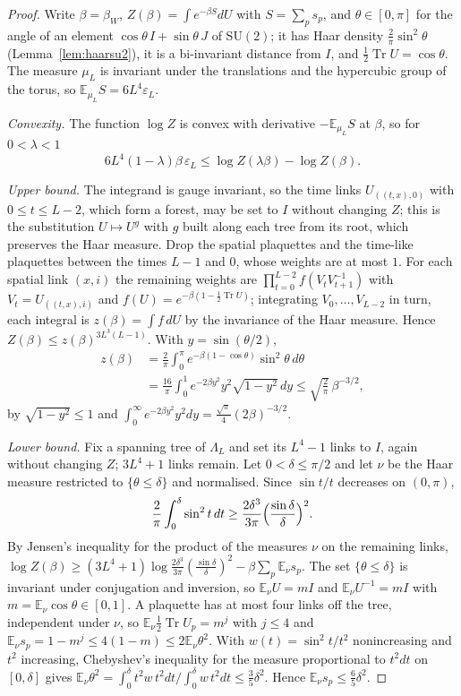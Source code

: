 \documentclass[aps,prd,twocolumn,superscriptaddress,nofootinbib,longbibliography,floatfix,amsmath,amssymb,10pt]{revtex4-2}
\theoremstyle{definition}
\theoremstyle{remark}
\newcommand{\E}{\mathbb{E}}
\newcommand{\SU}{\mathrm{SU}}
\newcommand{\Tr}{\operatorname{Tr}}
\begin{document}
\begin{proof}
Write $\beta=\beta_W$, $Z(\beta)=\int e^{-\beta S}dU$ with $S=\sum_ps_p$, and
$\theta\in[0,\pi]$ for the angle of an element $\cos\theta\,I+\sin\theta\,J$
of $\SU(2)$; it has Haar density $\frac2\pi\sin^2\theta$ (Lemma~\ref{lem:haarsu2}), it is a
bi-invariant distance from $I$, and $\frac12\Tr U=\cos\theta$. The measure
$\mu_L$ is invariant under the translations and the hypercubic group of the
torus, so $\E_{\mu_L}S=6L^4\varepsilon_L$.

\emph{Convexity.} The function $\log Z$ is convex with derivative
$-\E_{\mu_L}S$ at $\beta$, so for $0<\lambda<1$
\[
6L^4(1-\lambda)\beta\,\varepsilon_L\le\log Z(\lambda\beta)-\log Z(\beta) .
\]

\emph{Upper bound.} The integrand is gauge invariant, so the time links
$U_{((t,x),0)}$ with $0\le t\le L-2$, which form a forest, may be set to $I$
without changing $Z$; this is the substitution $U\mapsto U^g$ with $g$ built
along each tree from its root, which preserves the Haar measure. Drop the
spatial plaquettes and the time-like plaquettes between the times $L-1$ and
$0$, whose weights are at most $1$. For each spatial link $(x,i)$ the
remaining weights are $\prod_{t=0}^{L-2}f(V_tV_{t+1}^{-1})$ with
$V_t=U_{((t,x),i)}$ and $f(U)=e^{-\beta(1-\frac12\Tr U)}$; integrating
$V_0,\dots,V_{L-2}$ in turn, each integral is $z(\beta)=\int f\,dU$ by the
invariance of the Haar measure. Hence $Z(\beta)\le z(\beta)^{3L^3(L-1)}$.
With $y=\sin(\theta/2)$,
\begin{align*}
z(\beta)&=\frac2\pi\int_0^\pi e^{-\beta(1-\cos\theta)}\sin^2\theta\,d\theta\\
&=\frac{16}\pi\int_0^1e^{-2\beta y^2}y^2\sqrt{1-y^2}\,dy\le
\sqrt{\frac2\pi}\,\beta^{-3/2},
\end{align*}
by $\sqrt{1-y^2}\le1$ and $\int_0^\infty e^{-2\beta y^2}y^2dy=\frac{\sqrt\pi}4
(2\beta)^{-3/2}$.

\emph{Lower bound.} Fix a spanning tree of $\Lambda_L$ and set its $L^4-1$
links to $I$, again without changing $Z$; $3L^4+1$ links remain. Let $0<\delta
\le\pi/2$ and let $\nu$ be the Haar measure restricted to $\{\theta\le\delta\}$
and normalised. Since $\sin t/t$ decreases on $(0,\pi)$,
\[
\frac2\pi\int_0^\delta\sin^2t\,dt\ge\frac{2\delta^3}{3\pi}\Bigl(\frac{\sin
\delta}\delta\Bigr)^2 .
\]
By Jensen's inequality for the product of the measures $\nu$ on the remaining
links, $\log Z(\beta)\ge(3L^4+1)\log\frac{2\delta^3}{3\pi}(\frac{\sin\delta}
\delta)^2-\beta\sum_p\E_\nu s_p$. The set $\{\theta\le\delta\}$ is invariant
under conjugation and inversion, so $\E_\nu U=mI$ and $\E_\nu U^{-1}=mI$ with
$m=\E_\nu\cos\theta\in[0,1]$. A plaquette has at most four links off the
tree, independent under $\nu$, so $\E_\nu\frac12\Tr U_p=m^j$ with $j\le4$ and
$\E_\nu s_p=1-m^j\le4(1-m)\le2\E_\nu\theta^2$. With $w(t)=\sin^2t/t^2$
nonincreasing and $t^2$ increasing, Chebyshev's inequality for the measure
proportional to $t^2dt$ on $[0,\delta]$ gives $\E_\nu\theta^2=\int_0^\delta
t^2w\,t^2dt/\int_0^\delta w\,t^2dt\le\frac35\delta^2$. Hence $\E_\nu s_p\le
\frac65\delta^2$.


\end{proof}
\end{document}
